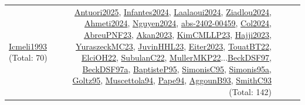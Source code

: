 {\begin{longtable}{p{3cm}r>{\raggedright\arraybackslash}p{6cm}>{\raggedright\arraybackslash}p{6cm}>{\raggedright\arraybackslash}p{8cm}}
\hyperref[detail:Icmeli1993]{Icmeli1993} (Total: 70) & \hyperref[detail:Antuori2025]{Antuori2025}, \hyperref[detail:Infantes2024]{Infantes2024}, \hyperref[detail:Laalaoui2024]{Laalaoui2024}, \hyperref[detail:Ziadlou2024]{Ziadlou2024}, \hyperref[detail:Ahmeti2024]{Ahmeti2024}, \hyperref[detail:Nguyen2024]{Nguyen2024}, \hyperref[detail:abs-2402-00459]{abs-2402-00459}, \hyperref[detail:Col2024]{Col2024}, \hyperref[detail:AbreuPNF23]{AbreuPNF23}, \hyperref[detail:Akan2023]{Akan2023}, \hyperref[detail:KimCMLLP23]{KimCMLLP23}, \hyperref[detail:Hajji2023]{Hajji2023}, \hyperref[detail:YuraszeckMC23]{YuraszeckMC23}, \hyperref[detail:JuvinHHL23]{JuvinHHL23}, \hyperref[detail:Eiter2023]{Eiter2023}, \hyperref[detail:TouatBT22]{TouatBT22}, \hyperref[detail:ElciOH22]{ElciOH22}, \hyperref[detail:SubulanC22]{SubulanC22}, \hyperref[detail:MullerMKP22]{MullerMKP22}...\hyperref[detail:BeckDSF97]{BeckDSF97}, \hyperref[detail:BeckDSF97a]{BeckDSF97a}, \hyperref[detail:BaptisteP95]{BaptisteP95}, \hyperref[detail:SimonisC95]{SimonisC95}, \hyperref[detail:Simonis95a]{Simonis95a}, \hyperref[detail:Goltz95]{Goltz95}, \hyperref[detail:Muscettola94]{Muscettola94}, \hyperref[detail:Pape94]{Pape94}, \hyperref[detail:AggounB93]{AggounB93}, \hyperref[detail:SmithC93]{SmithC93} (Total: 142)\\

\end{longtable}}
